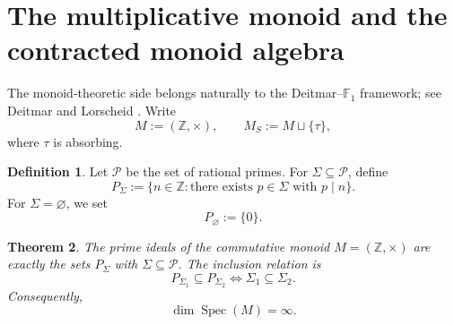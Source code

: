 \documentclass[11pt]{article}
\newtheorem{theorem}{Theorem}[section]
\theoremstyle{definition}
\newtheorem{definition}[theorem]{Definition}
\newcommand{\Z}{\mathbb Z}
\newcommand{\Spec}{\operatorname{Spec}}
\newcommand{\taup}{\tau}
\begin{document}
\section{The multiplicative monoid and the contracted monoid algebra}

The monoid-theoretic side belongs naturally to the Deitmar--\(\mathbb F_1\) framework; see Deitmar \cite{deitmar} and Lorscheid \cite{lorscheidview,lorscheid}.  Write
\[
M:=(\Z,\times),
\qquad
M_S:=M\sqcup\{\taup\},
\]
where \(\taup\) is absorbing.

\begin{definition}
Let \(\mathcal P\) be the set of rational primes.  For \(\Sigma\subseteq\mathcal P\), define
\[
P_\Sigma:=\{n\in\Z: \text{there exists }p\in\Sigma\text{ with }p\mid n\}.
\]
For \(\Sigma=\varnothing\), we set
\[
P_{\varnothing}:=\{0\}.
\]
\end{definition}

\begin{theorem}\label{thm:monoid-spec-z}
The prime ideals of the commutative monoid \(M=(\Z,\times)\) are exactly the sets \(P_\Sigma\) with \(\Sigma\subseteq \mathcal P\).  The inclusion relation is
\[
P_{\Sigma_1}\subseteq P_{\Sigma_2}
\iff
\Sigma_1\subseteq\Sigma_2.
\]
Consequently,
\[
\dim \Spec(M)=\infty.
\]
\end{theorem}
\end{document}

